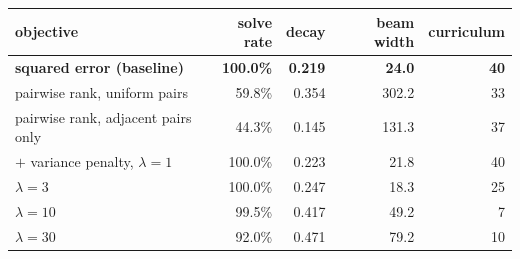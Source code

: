 \begin{tabular}{lrrrr}
\toprule
objective & solve rate & decay & beam width & curriculum \\
\midrule
\textbf{squared error (baseline)} & \textbf{100.0\%} & \textbf{0.219} & \textbf{24.0} & \textbf{40} \\
pairwise rank, uniform pairs & 59.8\% & 0.354 & 302.2 & 33 \\
pairwise rank, adjacent pairs only & 44.3\% & 0.145 & 131.3 & 37 \\
\midrule
\quad $+$ variance penalty, $\lambda=1$ & 100.0\% & 0.223 & 21.8 & 40 \\
\quad $\lambda=3$ & 100.0\% & 0.247 & 18.3 & 25 \\
\quad $\lambda=10$ & 99.5\% & 0.417 & 49.2 & 7 \\
\quad $\lambda=30$ & 92.0\% & 0.471 & 79.2 & 10 \\
\bottomrule
\end{tabular}
